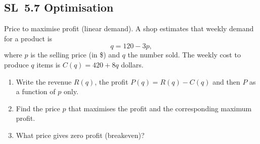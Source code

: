 \documentclass[11pt]{article}
\def\textbf#1{#1}%
\newcommand{\tocsubsection}[1]{\subsection{#1}}
\newcounter{question}
\begin{document}

\tocsubsection{SL 5.7 \; Optimisation}


\begin{question}
\textbf{Price to maximise profit (linear demand).}
A shop estimates that weekly demand for a product is
\[
q=120-3p,
\]
where $p$ is the selling price (in \$) and $q$ the number sold. The weekly cost to produce $q$ items is $C(q)=420+8q$ dollars.
\begin{enumerate}
  \item Write the revenue $R(q)$, the profit $P(q)=R(q)-C(q)$ and then $P$ as a function of $p$ only.
  \item Find the price $p$ that maximises the profit and the corresponding maximum profit.
  \item What price gives zero profit (breakeven)?
\end{enumerate}

\begin{center}
\end{center}
\end{question}
\end{document}

